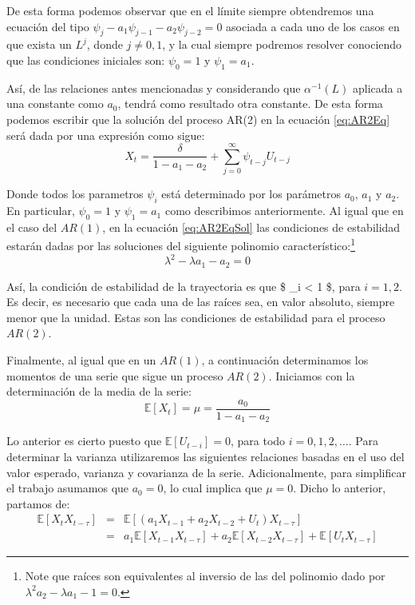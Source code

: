 \documentclass[
]{book}
\begin{document}
De esta forma podemos observar que en el límite siempre obtendremos una ecuación del tipo \(\psi_j - a_1 \psi_{j-1} - a_2 \psi_{j-2} = 0\) asociada a cada uno de los casos en que exista un \(L^j\), donde \(j \neq 0, 1\), y la cual siempre podremos resolver conociendo que las condiciones iniciales son: \(\psi_0 = 1\) y \(\psi_1 = a_1\).

Así, de las relaciones antes mencionadas y considerando que \(\alpha^{-1} (L)\) aplicada a una constante como \(a_0\), tendrá como
resultado otra constante. De esta forma podemos escribir que la solución del proceso AR(2) en la ecuación \eqref{eq:AR2Eq} será dada por una expresión como sigue:
\begin{equation}
    X_t = \frac{\delta}{1 - a_1 - a_2} + \sum^{\infty}_{j = 0} \psi_{t - j} U_{t - j}
    \label{eq:AR2EqSol}
\end{equation}

Donde todos los parametros \(\psi_i\) está determinado por los parámetros \(a_0\), \(a_1\) y \(a_2\). En particular, \(\psi_0 = 1\) y \(\psi_1 = a_1\) como describimos anteriormente. Al igual que en el caso del \(AR(1)\), en la ecuación \eqref{eq:AR2EqSol} las condiciones de estabilidad estarán dadas por las soluciones del siguiente polinomio característico:\footnote{Note que raíces son equivalentes al inversio de las del polinomio dado por $\lambda^2 a_2 - \lambda a_1 - 1 = 0$.}
\begin{equation}
    \lambda^2 - \lambda a_1 - a_2 = 0
\end{equation}

Así, la condición de estabilidad de la trayectoria es que \$ \textbar{} \lambda\_i \textbar{} \textless{} 1 \$, para \(i = 1, 2\). Es decir, es necesario que cada
una de las raíces sea, en valor absoluto, siempre menor que la unidad. Estas son las condiciones de estabilidad para el proceso \(AR(2)\).

Finalmente, al igual que en un \(AR(1)\), a continuación determinamos los momentos de una serie que sigue un proceso \(AR(2)\). Iniciamos con la determinación de la media de la serie:
\begin{equation}
    \mathbb{E}[X_t] = \mu = \frac{a_0}{1 - a_1 - a_2}
\end{equation}

Lo anterior es cierto puesto que \(\mathbb{E}[U_{t - i}] = 0\), para todo \(i = 0, 1, 2, \ldots\). Para determinar la varianza utilizaremos las siguientes relaciones basadas en el uso del valor esperado, varianza y covarianza de la serie. Adicionalmente, para simplificar el trabajo asumamos que \(a_0 = 0\), lo cual implica que \(\mu = 0\). Dicho lo anterior, partamos de:
\begin{eqnarray*}
    \mathbb{E}[X_t X_{t - \tau}] & = & \mathbb{E}[(a_1 X_{t-1} + a_2 X_{t-2} + U_t) X_{t - \tau}]\\
    & = & a_1 \mathbb{E}[X_{t - 1} X_{t - \tau}] + a_2 \mathbb{E}[X_{t - 2} X_{t - \tau}] + \mathbb{E}[U_{t} X_{t - \tau}]
\end{eqnarray*}
\end{document}
